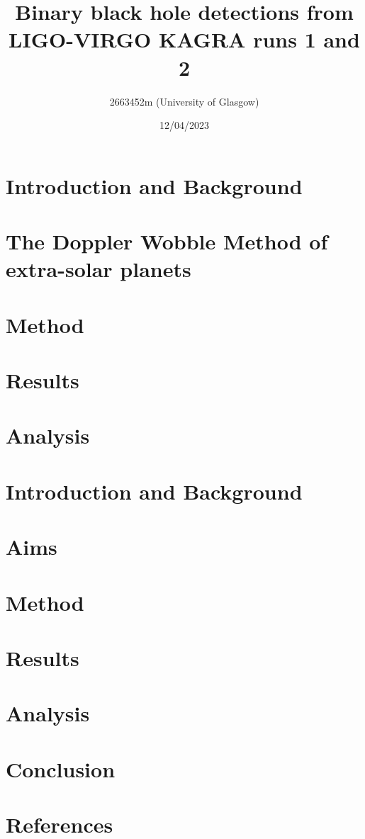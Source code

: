 \documentclass[]{article}
\title{\textbf{Binary black hole detections from LIGO-VIRGO KAGRA runs 1 and 2}}
\author{2663452m (University of Glasgow)}
\date{12/04/2023}
\begin{document}
\maketitle

\begin{abstract}

\end{abstract}
\twocolumn
\newpage





\section*{Introduction and Background}

\section*{The Doppler Wobble Method of extra-solar planets}




\section*{Method}




\section*{Results}



\section*{Analysis}




\newpage
\section*{Introduction and Background}

\section*{Aims}



\section*{Method}

\section*{Results}

\section*{Analysis}


\section*{Conclusion}

\section*{References}
\end{document}
